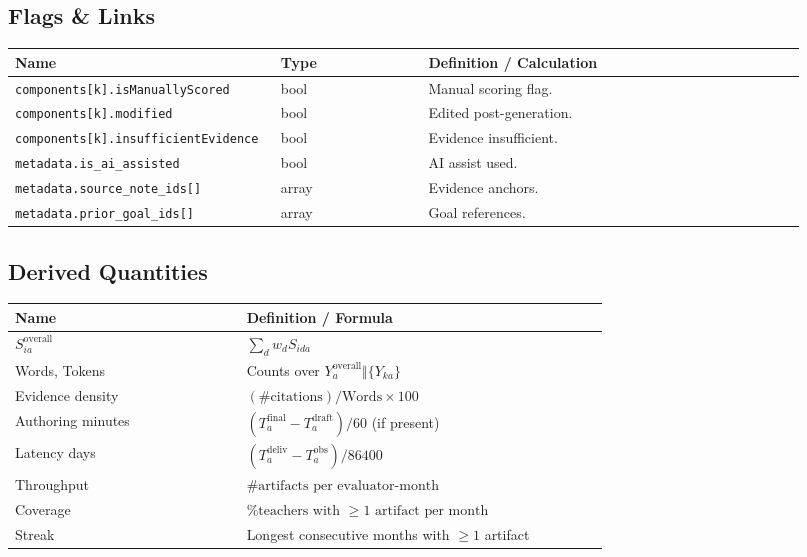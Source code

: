 \documentclass[11pt]{article}
\begin{document}
\subsection*{Flags \& Links}
\begin{longtable}{@{}p{0.28\linewidth}p{0.18\linewidth}p{0.46\linewidth}@{}}
\toprule
\textbf{Name} & \textbf{Type} & \textbf{Definition / Calculation} \\
\midrule
\endhead
\texttt{components[k].isManuallyScored} & bool & Manual scoring flag. \\
\texttt{components[k].modified} & bool & Edited post-generation. \\
\texttt{components[k].insufficientEvidence} & bool & Evidence insufficient. \\
\texttt{metadata.is\_ai\_assisted} & bool & AI assist used. \\
\texttt{metadata.source\_note\_ids[]} & array & Evidence anchors. \\
\texttt{metadata.prior\_goal\_ids[]} & array & Goal references. \\
\bottomrule
\end{longtable}

\subsection*{Derived Quantities}
\begin{longtable}{@{}p{0.32\linewidth}p{0.50\linewidth}@{}}
\toprule
\textbf{Name} & \textbf{Definition / Formula} \\
\midrule
\endhead
$S^{\mathrm{overall}}_{i a}$ & $\sum_d w_d S_{i d a}$ \\
Words, Tokens & Counts over $Y^{\mathrm{overall}}_a \Vert \{Y_{k a}\}$ \\
Evidence density & $(\#\text{citations}) / \text{Words} \times 100$ \\
Authoring minutes & $(T^{\mathrm{final}}_a - T^{\mathrm{draft}}_a)/60$ (if present) \\
Latency days & $(T^{\mathrm{deliv}}_a - T^{\mathrm{obs}}_a)/86400$ \\
Throughput & $\#\text{artifacts per evaluator-month}$ \\
Coverage & $\%\text{teachers with }\ge 1 \text{ artifact per month}$ \\
Streak & Longest consecutive months with $\ge 1$ artifact \\
\bottomrule
\end{longtable}
\end{document}
